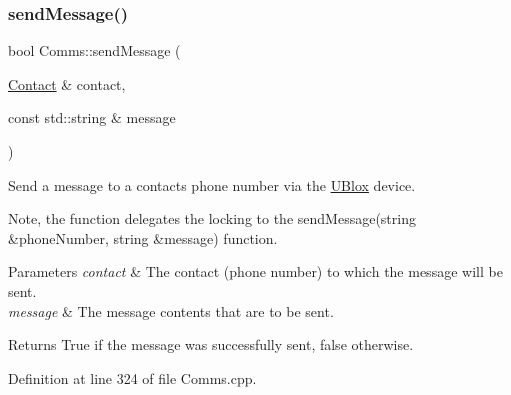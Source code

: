 \subsubsection{\texorpdfstring{send\+Message()}{sendMessage()}\hspace{0.1cm}{\footnotesize\ttfamily [1/2]}}
{\footnotesize\ttfamily bool Comms\+::send\+Message (\begin{DoxyParamCaption}\item[{\hyperlink{class_contact}{Contact} \&}]{contact,  }\item[{const std\+::string \&}]{message }\end{DoxyParamCaption})}

Send a message to a contacts phone number via the \hyperlink{class_u_blox}{U\+Blox} device.

Note, the function delegates the locking to the send\+Message(string \&phone\+Number, string \&message) function.


\begin{DoxyParams}{Parameters}
{\em contact} & The contact (phone number) to which the message will be sent. \\
\hline
{\em message} & The message contents that are to be sent. \\
\hline
\end{DoxyParams}
\begin{DoxyReturn}{Returns}
True if the message was successfully sent, false otherwise. 
\end{DoxyReturn}


Definition at line 324 of file Comms.\+cpp.


